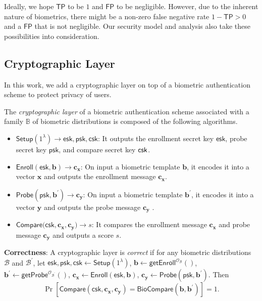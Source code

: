 Ideally, we hope $\mathsf{TP}$ to be $1$ and $\mathsf{FP}$ to be negligible. However, due to the inherent nature of biometrics, there might be a non-zero false negative rate $ 1 - \mathsf{TP} > 0$ and a $\mathsf{FP}$ that is not negligible. Our security model and analysis also take these possibilities into consideration.




\subsection{Cryptographic Layer}
\label{sec:formalization:cryptographic_layer}
In this work, we add a cryptographic layer on top of a biometric authentication scheme to protect privacy of users.

\begin{definition}

The \emph{cryptographic layer} of a biometric authentication scheme associated with a family $\mathbb{B}$ of biometric distributions is composed of the following algorithms.

\begin{itemize}

	\item $\mathsf{Setup}(1^\lambda) \to \mathsf{esk}, \mathsf{psk}, \mathsf{csk}$: It outputs the enrollment secret key $\mathsf{esk}$, probe secret key $\mathsf{psk}$, and compare secret key $\sf csk$.

	\item $\mathsf{Enroll}(\mathsf{esk}, \mathbf{b}) \to \mathbf{c_x}$: On input a biometric template $\mathbf{b}$, it encodes it into a vector $\mathbf{x}$ and outputs the enrollment message $\mathbf{c_x}$.
	
	\item $\mathsf{Probe}(\mathsf{psk}, \mathbf{b}^\prime) \to \mathbf{c_y}$: On input a biometric template $\mathbf{b}^\prime$, it encodes it into a vector $\mathbf{y}$ and outputs the probe message $\mathbf{c_y}$ .

	\item $\mathsf{Compare}(\mathsf{csk}, \mathbf{c_x}, \mathbf{c_y)} \to s$: It compares the enrollment message $\mathbf{c_x}$ and probe message $\mathbf{c_y}$ and outputs a score $s$.

\end{itemize}

\noindent \textbf{Correctness}: A cryptographic layer is \emph{correct} if for any biometric distributions $\mathcal{B}$ and $\mathcal{B}^\prime$, let $\mathsf{esk}, \mathsf{psk}, \mathsf{csk} \gets \mathsf{Setup}(1^\lambda)$, $\mathbf{b} \gets \mathsf{getEnroll}^{\mathcal{O}_\mathcal{B}}()$, $\mathbf{b}^\prime \gets \mathsf{getProbe}^{\mathcal{O}_{\mathcal{B}^\prime}}()$, $\mathbf{c_x} \gets \mathsf{Enroll}(\mathsf{esk}, \mathbf{b})$, $\mathbf{c_y} \gets \mathsf{Probe}(\mathsf{psk}, \mathbf{b}^\prime)$. Then
	\[
		\Pr \left [
			\mathsf{Compare}(\mathsf{csk}, \mathbf{c_x}, \mathbf{c_y}) = \mathsf{BioCompare}(\mathbf{b}, \mathbf{b}^\prime)
		\right ] = 1.
	\]

\end{definition}


